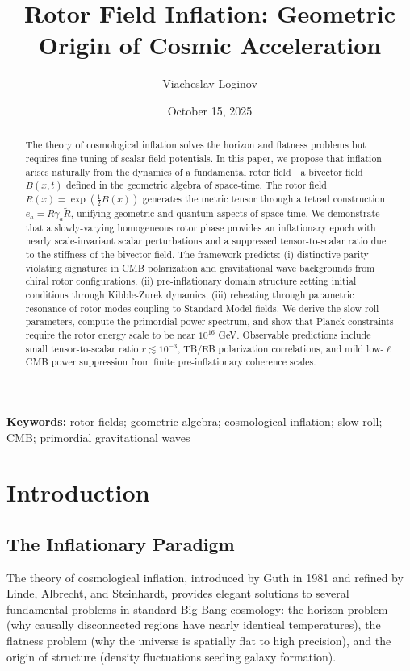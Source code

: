 \documentclass[11pt,a4paper]{article}
\title{Rotor Field Inflation: Geometric Origin of Cosmic Acceleration}
\author[1]{Viacheslav Loginov}
\affil[1]{Kyiv, Ukraine\\ \texttt{barthez.slavik@gmail.com}}
\date{October 15, 2025}
\numberwithin{equation}{section}
\theoremstyle{plain}
\theoremstyle{definition}
\theoremstyle{remark}
\newcommand{\keywords}{\textbf{Keywords:} rotor fields; geometric algebra; cosmological inflation; slow-roll; CMB; primordial gravitational waves}
\begin{document}
\maketitle

\begin{abstract}
The theory of cosmological inflation solves the horizon and flatness problems but requires fine-tuning of scalar field potentials. In this paper, we propose that inflation arises naturally from the dynamics of a fundamental rotor field---a bivector field $B(x,t)$ defined in the geometric algebra of space-time. The rotor field $R(x) = \exp(\frac{1}{2}B(x))$ generates the metric tensor through a tetrad construction $e_a = R\gamma_a\widetilde{R}$, unifying geometric and quantum aspects of space-time. We demonstrate that a slowly-varying homogeneous rotor phase provides an inflationary epoch with nearly scale-invariant scalar perturbations and a suppressed tensor-to-scalar ratio due to the stiffness of the bivector field. The framework predicts: (i) distinctive parity-violating signatures in CMB polarization and gravitational wave backgrounds from chiral rotor configurations, (ii) pre-inflationary domain structure setting initial conditions through Kibble-Zurek dynamics, (iii) reheating through parametric resonance of rotor modes coupling to Standard Model fields. We derive the slow-roll parameters, compute the primordial power spectrum, and show that Planck constraints require the rotor energy scale to be near $10^{16}$ GeV. Observable predictions include small tensor-to-scalar ratio $r \lesssim 10^{-3}$, TB/EB polarization correlations, and mild low-$\ell$ CMB power suppression from finite pre-inflationary coherence scales.
\end{abstract}

\keywords

\section{Introduction}
\label{sec:intro}

\subsection{The Inflationary Paradigm}

The theory of cosmological inflation, introduced by Guth in 1981 and refined by Linde, Albrecht, and Steinhardt, provides elegant solutions to several fundamental problems in standard Big Bang cosmology: the horizon problem (why causally disconnected regions have nearly identical temperatures), the flatness problem (why the universe is spatially flat to high precision), and the origin of structure (density fluctuations seeding galaxy formation).
\end{document}
